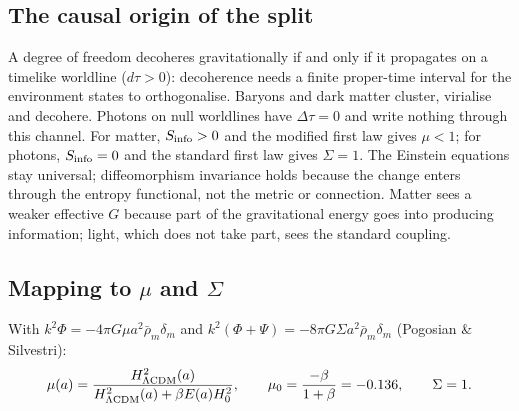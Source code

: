 \subsection{The causal origin of the split}
A degree of freedom decoheres gravitationally if and only if it propagates on a timelike worldline ($d\tau>0$): decoherence needs a finite proper-time
interval for the environment states to orthogonalise. Baryons and dark matter cluster, virialise and decohere. Photons on null worldlines have
$\Delta\tau=0$ and write nothing through this channel. For matter, $S_{\rm info}>0$ and the modified first law gives $\mu<1$; for photons, $S_{\rm info}=0$
and the standard first law gives $\Sigma=1$. The Einstein equations stay universal; diffeomorphism invariance holds because the change enters through
the entropy functional, not the metric or connection. Matter sees a weaker effective $G$ because part of the gravitational energy goes into producing
information; light, which does not take part, sees the standard coupling.

\subsection{Mapping to $\mu$ and $\Sigma$}
With $k^2\Phi=-4\pi G\mu a^2\bar\rho_m\delta_m$ and $k^2(\Phi+\Psi)=-8\pi G\Sigma a^2\bar\rho_m\delta_m$ (Pogosian \& Silvestri):
\begin{equation}\mu(a)=\frac{H^2_{\Lambda\rm CDM}(a)}{H^2_{\Lambda\rm CDM}(a)+\beta E(a)H_0^2},\qquad\mu_0=\frac{-\beta}{1+\beta}=-0.136,\qquad\Sigma=1.\end{equation}

